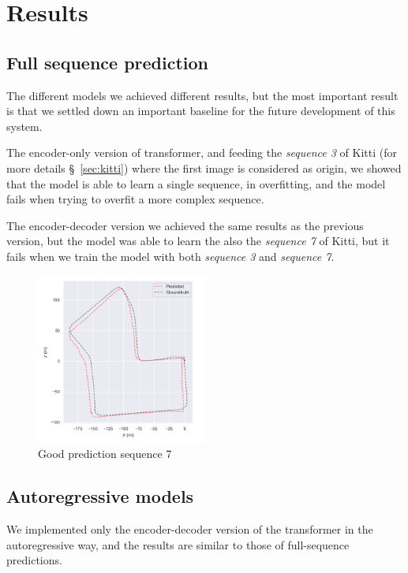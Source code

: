 \section{Results}\label{sec:results}
\subsection{Full sequence prediction}\label{subsec:full-sequence-prediction}
The different models we achieved different results, but the most important result is that we settled down an important baseline for the future development of this system.

The encoder-only version of transformer, and feeding the \textit{sequence 3} of Kitti (for more details \S~\ref{sec:kitti}) where the first image is considered as origin, we showed that the model is able to learn a single sequence, in overfitting, and the model fails when trying to overfit a more complex sequence.

The encoder-decoder version we achieved the same results as the previous version, but the model was able to learn the also the \textit{sequence 7} of Kitti, but it fails when we train the model with both \textit{sequence 3} and \textit{sequence 7}.
\begin{figure}[H]
    \centering
    \includegraphics[width=0.5\textwidth]{images/1_4_well_predicted_seq_7}
    \caption{Good prediction sequence 7}\label{fig:well-predicted-seq-7}
\end{figure}

\subsection{Autoregressive models}\label{subsec:autoregressive-model}
We implemented only the encoder-decoder version of the transformer in the autoregressive way, and the results are similar to those of full-sequence predictions.